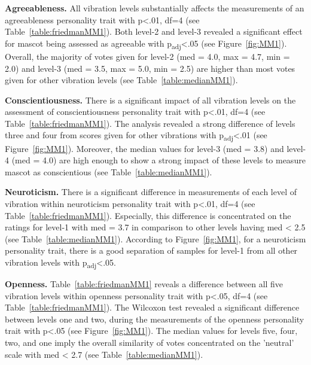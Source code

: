 \par\textbf{Agreeableness.}
All vibration levels substantially affects the measurements of an agreeableness personality
trait with p<.01, df=4 (see Table~\ref{table:friedmanMM1}).
Both level-2 and level-3 revealed a significant effect for mascot being
assessed as agreeable with p\textsubscript{adj}<.05 (see Figure~\ref{fig:MM1}).
Overall, the majority of votes given for level-2 (med = 4.0, max = 4.7, min = 2.0) and level-3
(med = 3.5, max = 5.0, min = 2.5) are higher than most
votes given for other vibration levels (see Table~\ref{table:medianMM1}).

\par\textbf{Conscientiousness.}
There is a significant impact of all vibration levels on the assessment of conscientiousness
personality trait with p<.01, df=4 (see Table~\ref{table:friedmanMM1}).
The analysis revealed a strong difference of levels three and four
from scores given for other vibrations with p\textsubscript{adj}<.01 (see Figure~\ref{fig:MM1}).
Moreover, the median values for level-3 (med = 3.8) and level-4 (med = 4.0) are high enough
to show a strong impact of these levels to measure mascot as conscientious (see Table~\ref{table:medianMM1}).

\par\textbf{Neuroticism.}
There is a significant difference in measurements of each level of vibration within neuroticism
personality trait with p<.01, df=4 (see Table~\ref{table:friedmanMM1}).
Especially, this difference is concentrated on the ratings for level-1 with med = 3.7
in comparison to other levels having med < 2.5 (see Table~\ref{table:medianMM1}).
According to Figure~\ref{fig:MM1}, for a neuroticism personality trait, there is a good separation of samples for level-1
from all other vibration levels with p\textsubscript{adj}<.05.

\par\textbf{Openness.}
Table~\ref{table:friedmanMM1} reveals a difference between all five vibration levels within
openness personality trait with p<.05, df=4 (see Table~\ref{table:friedmanMM1}).
The Wilcoxon test revealed a significant difference between levels one and two,
during the measurements of the openness personality trait with p<.05 (see Figure~\ref{fig:MM1}).
The median values for levels five, four, two, and one imply the overall
similarity of votes concentrated on the 'neutral' scale with med < 2.7 (see Table~\ref{table:medianMM1}).

